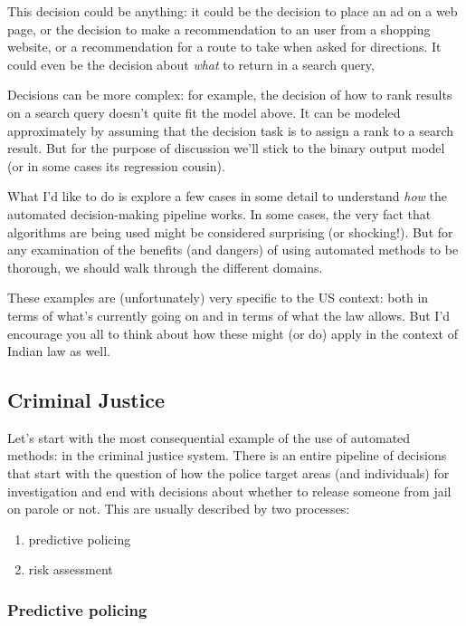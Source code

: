 \documentclass[11pt]{paper}
\begin{document}
This decision could be anything: it could be the decision to place an ad
on a web page, or the decision to make a recommendation to an user from
a shopping website, or a recommendation for a route to take when asked
for directions. It could even be the decision about \emph{what} to
return in a search query,

Decisions can be more complex: for example, the decision of how to rank
results on a search query doesn't quite fit the model above. It can be
modeled approximately by assuming that the decision task is to assign a
rank to a search result. But for the purpose of discussion we'll stick
to the binary output model (or in some cases its regression cousin).

What I'd like to do is explore a few cases in some detail to understand
\emph{how} the automated decision-making pipeline works. In some cases,
the very fact that algorithms are being used might be considered
surprising (or shocking!). But for any examination of the benefits (and
dangers) of using automated methods to be thorough, we should walk
through the different domains.

These examples are (unfortunately) very specific to the US context: both
in terms of what's currently going on and in terms of what the law
allows. But I'd encourage you all to think about how these might (or do)
apply in the context of Indian law as well.

\subsection{Criminal Justice}\label{criminal-justice}

Let's start with the most consequential example of the use of automated
methods: in the criminal justice system. There is an entire pipeline of
decisions that start with the question of how the police target areas
(and individuals) for investigation and end with decisions about whether
to release someone from jail on parole or not. This are usually
described by two processes:

\begin{enumerate}
\def\labelenumi{\arabic{enumi}.}
\itemsep1pt\parskip0pt
\item
  predictive policing
\item
  risk assessment
\end{enumerate}

\subsubsection{Predictive policing}\label{predictive-policing}
\end{document}
